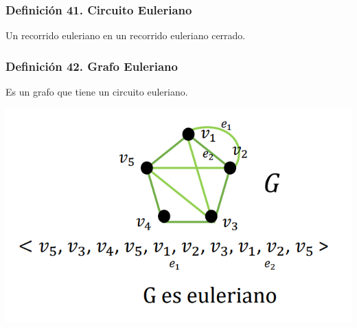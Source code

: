 \documentclass{article}
\begin{document}
\subsubsection*{Definición 41. Circuito Euleriano}
Un recorrido euleriano en un recorrido euleriano cerrado.

\subsubsection*{Definición 42. Grafo Euleriano}
Es un grafo que tiene un circuito euleriano.
\begin{center}
\begin{minipage}[c]{.45\textwidth}
    \includegraphics[width=\textwidth]{grafoEuleriano.PNG}
\end{minipage}
\end{center}
\end{document}
